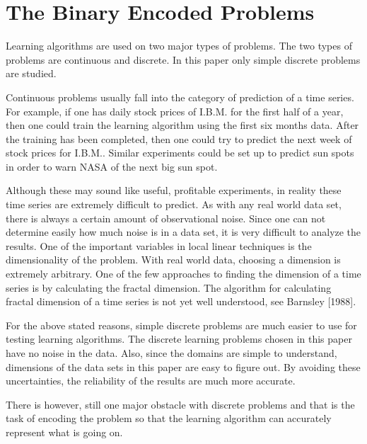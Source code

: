 \parskip 0.20in
\textheight 8.75in
\textwidth 6.0in
\topmargin -0.25in
\oddsidemargin 0.40in


\baselineskip 0.30in

\setcounter{chapter}{3}
\setcounter{page}{19}

\chapter{The Binary Encoded Problems}	

	Learning algorithms are used on two major types of problems.
The two types of problems are continuous and discrete.  In this paper only
simple discrete problems are studied.

 	Continuous problems usually fall into the category of prediction
of a time series.  For example, if one has daily stock prices of
I.B.M. for the first half of a year, then one could train the learning
algorithm using the first six months data.  After the training has
been completed, then one could try to predict the next week of stock
prices for I.B.M..  Similar experiments could be set up to predict sun
spots in order to warn NASA of the next big sun spot.

	Although these may sound like useful, profitable experiments,
in reality these time series are extremely difficult to predict.  As
with any real world data set, there is always a certain amount of
observational noise.  Since one can not determine easily how much
noise is in a data set, it is very difficult to analyze the results.
One of the important variables in local linear techniques is the
dimensionality of the problem.  With real world data, choosing a
dimension is extremely arbitrary.  One of the few approaches to
finding the dimension of a time series is by calculating the fractal
dimension.  The algorithm for calculating fractal dimension of a time
series is not yet well understood, see Barnsley [1988]. 

	For the above stated reasons, simple discrete problems are
much easier to use for testing learning algorithms.  The discrete
learning problems chosen in this paper have no noise in the data.
Also, since the domains are simple to understand, dimensions of the
data sets in this paper are easy to figure out.  By avoiding these
uncertainties, the reliability of the results are much more accurate.

	There is however, still one major obstacle with discrete
problems and that is the task of encoding the problem so that the
learning algorithm can accurately represent what is going on.  

